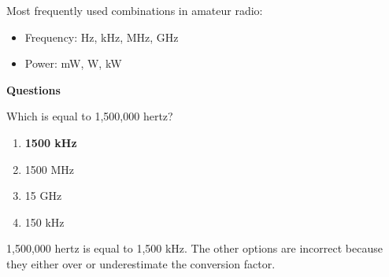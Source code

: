 \begin{tcolorbox}[colback=gray!10!white,colframe=black!75!black,title={Common Usage}]
Most frequently used combinations in amateur radio:
\begin{itemize}[noitemsep]
    \item Frequency: Hz, kHz, MHz, GHz
    \item Power: mW, W, kW
\end{itemize}
\end{tcolorbox}


\textbf{Questions}


\begin{tcolorbox}[colback=gray!10!white,colframe=black!75!black,title={T5B02}]
    Which is equal to 1,500,000 hertz?
    \begin{enumerate}[label=\Alph*),noitemsep]
        \item \textbf{1500 kHz}
        \item 1500 MHz
        \item 15 GHz
        \item 150 kHz
    \end{enumerate}
\end{tcolorbox}
1,500,000 hertz is equal to 1,500 kHz. The other options are incorrect because they either over or underestimate the conversion factor.


